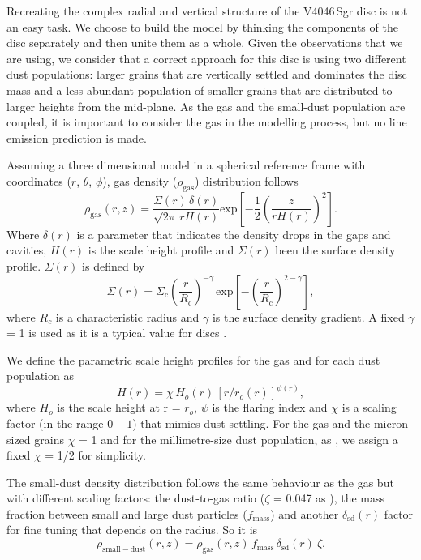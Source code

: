 \documentclass[letters, usenatbib]{mnras}
\begin{document}
Recreating the complex radial and vertical structure of the V4046\,Sgr disc is not an easy task. We choose to build the model by thinking the components of the disc separately and then unite them as a whole. Given the observations that we are using, we consider that a correct approach for this disc is using two different dust populations: larger grains that are vertically settled and dominates the disc mass and a less-abundant population of smaller grains that are distributed to larger heights from the mid-plane. As the gas and the small-dust population are coupled, it is important to consider the gas in the modelling process, but no line emission prediction is made. 

Assuming a three dimensional model in a spherical reference frame with coordinates ($r$, $\theta$, $\phi$), gas density ($\rho_{\mathrm{gas}}$) distribution follows
\begin{equation}
  \rho_{\mathrm{gas}}(r,z) =\frac{\Sigma(r) \,\delta(r)}{\sqrt{2\pi} \,r H(r)}  \mathrm{exp}\left[-\frac{1}{2} \left(\frac{z}{r H(r)}\right)^2\right].
\end{equation}
Where $\delta(r)$ is a parameter that indicates the density drops in the gaps and cavities, $H(r)$ is the scale height profile and $\Sigma(r)$ been the surface density profile. $\Sigma(r)$ is defined by
\begin{equation}
  \Sigma(r) = \Sigma_\mathrm{c} \left(\frac{r}{R_\mathrm{c}}\right)^{-\gamma}  \, \mathrm{exp}\left[-\left(\frac{r}{R_\mathrm{c}}\right)^{2-\gamma}\right],
\end{equation}
where $R_c$ is a characteristic radius and $\gamma$ is the surface density gradient. A fixed $\gamma$ = 1 is used as it is a typical value for discs \citep{Andrews_2009,Andrews_2010}. 

We define the parametric scale height profiles for the gas and for each dust population as \begin{equation}
    \label{scale}
  H(r)=\chi \, H_{o}(r) \, [r/r_{o}(r)]^{\psi(r)},
\end{equation}
where $H_o$ is the scale height at r = $r_o$, $\psi$ is the flaring index and $\chi$ is a scaling factor (in the range $0-1$) that mimics dust settling. For the gas and the micron-sized grains $\chi$ = 1 and for the millimetre-size dust population, as \citet{Rosenfeld_2013}, we assign a fixed $\chi$ = 1/2 for simplicity.

The small-dust density distribution follows the same behaviour as the gas but with different scaling factors: the dust-to-gas ratio ($\zeta$ = 0.047 as \citet{Rosenfeld_2013}), the mass fraction between small and large dust particles ($f_{\mathrm{mass}}$) and another $\delta_{\mathrm{sd}}(r)$ factor for fine tuning that depends on the radius. So it is
\begin{equation}
\rho_{\mathrm{small-dust}}(r,z)=\rho_{\mathrm{gas}}(r,z)\, f_{\mathrm{mass}} \, \delta_{\mathrm{sd}}(r) \: \zeta .
\end{equation}
\end{document}
